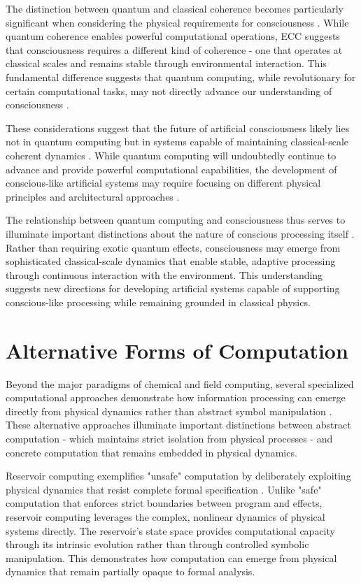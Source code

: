 \begin{refsection}
The distinction between quantum and classical coherence becomes particularly significant when considering the physical requirements for consciousness \cite{Aaronson2021a}. While quantum coherence enables powerful computational operations, ECC suggests that consciousness requires a different kind of coherence - one that operates at classical scales and remains stable through environmental interaction. This fundamental difference suggests that quantum computing, while revolutionary for certain computational tasks, may not directly advance our understanding of consciousness \cite{Arute2019}.

These considerations suggest that the future of artificial consciousness likely lies not in quantum computing but in systems capable of maintaining classical-scale coherent dynamics \cite{Bernstein2018}. While quantum computing will undoubtedly continue to advance and provide powerful computational capabilities, the development of conscious-like artificial systems may require focusing on different physical principles and architectural approaches \cite{Deutsch2020}.

The relationship between quantum computing and consciousness thus serves to illuminate important distinctions about the nature of conscious processing itself \cite{DiVincenzo2019}. Rather than requiring exotic quantum effects, consciousness may emerge from sophisticated classical-scale dynamics that enable stable, adaptive processing through continuous interaction with the environment. This understanding suggests new directions for developing artificial systems capable of supporting conscious-like processing while remaining grounded in classical physics.

\section{Alternative Forms of Computation}

Beyond the major paradigms of chemical and field computing, several specialized computational approaches demonstrate how information processing can emerge directly from physical dynamics rather than abstract symbol manipulation \cite{Adamatzky2021}. These alternative approaches illuminate important distinctions between abstract computation - which maintains strict isolation from physical processes - and concrete computation that remains embedded in physical dynamics.

Reservoir computing exemplifies "unsafe" computation by deliberately exploiting physical dynamics that resist complete formal specification \cite{Braund2020}. Unlike "safe" computation that enforces strict boundaries between program and effects, reservoir computing leverages the complex, nonlinear dynamics of physical systems directly. The reservoir's state space provides computational capacity through its intrinsic evolution rather than through controlled symbolic manipulation. This demonstrates how computation can emerge from physical dynamics that remain partially opaque to formal analysis.


\end{refsection}
